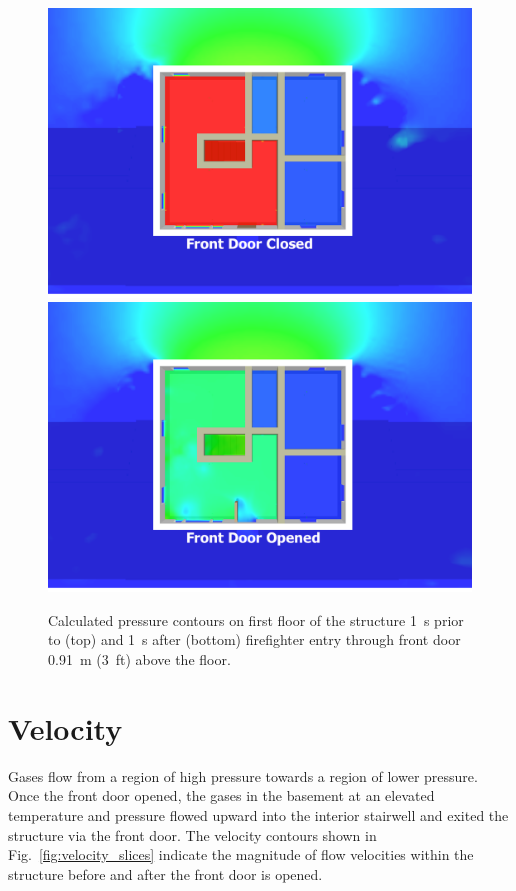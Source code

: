 \documentclass[12pt,oneside]{book}
\begin{document}
\begin{figure}[!ht]
\includegraphics[trim = 1in 1in 1in 1in, clip=true, width=.8\textwidth]{../Figures/pressure_slice_99s}
 \\
\vskip10pt
\includegraphics[trim = 1in 1in 1in 1in, clip=true, width=.8\textwidth]{../Figures/pressure_slice_101s}

\caption[Calculated pressure on first floor 1~s before and after front door opens]
{Calculated pressure contours on first floor of the structure 1~s prior to (top) and 1~s after (bottom) firefighter entry through front door 0.91~m (3~ft) above the floor.}
\label{fig:pressure_slices}
\end{figure}

\clearpage

\section{Velocity}
\label{velocity}

Gases flow from a region of high pressure towards a region of lower pressure. Once the front door opened, the gases in the basement at an elevated temperature and pressure flowed upward into the interior stairwell and exited the structure via the front door. The velocity contours shown in Fig.~\ref{fig:velocity_slices} indicate the magnitude of flow velocities within the structure before and after the front door is opened.
\end{document}
